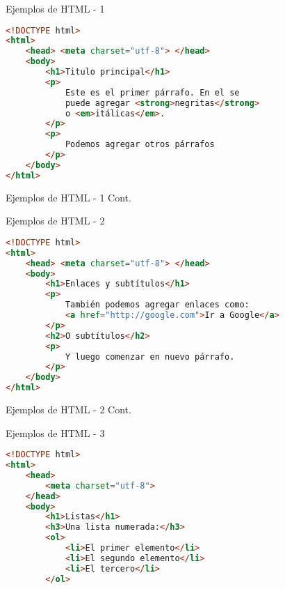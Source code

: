 
\begin{frame}[fragile]{Ejemplos de HTML - 1}
	\begin{lstlisting}[language=HTML]
<!DOCTYPE html>
<html>
	<head> <meta charset="utf-8"> </head>
	<body>
		<h1>Titulo principal</h1>
		<p>
			Este es el primer párrafo. En el se
			puede agregar <strong>negritas</strong>
			o <em>itálicas</em>.
		</p>
		<p>
			Podemos agregar otros párrafos
		</p>
	</body>
</html>
	\end{lstlisting}
\end{frame}


\begin{frame}[fragile]{Ejemplos de HTML - 1 Cont.}
\end{frame}


\begin{frame}[fragile]{Ejemplos de HTML - 2}
	\begin{lstlisting}[language=HTML]
<!DOCTYPE html>
<html>
	<head> <meta charset="utf-8"> </head>
	<body>
		<h1>Enlaces y subtítulos</h1>
		<p>
			También podemos agregar enlaces como:
			<a href="http://google.com">Ir a Google</a>
		</p>
		<h2>O subtítulos</h2>
		<p>
			Y luego comenzar en nuevo párrafo.
		</p>
	</body>
</html>
	\end{lstlisting}
\end{frame}


\begin{frame}[fragile]{Ejemplos de HTML - 2 Cont.}
\end{frame}


\begin{frame}[fragile]{Ejemplos de HTML - 3}
	\begin{lstlisting}[language=HTML]
<!DOCTYPE html>
<html>
	<head>
		<meta charset="utf-8">
	</head>
	<body>
		<h1>Listas</h1>
		<h3>Una lista numerada:</h3>
		<ol>
			<li>El primer elemento</li>
			<li>El segundo elemento</li>
			<li>El tercero</li>
		</ol>
	\end{lstlisting}
\end{frame}

